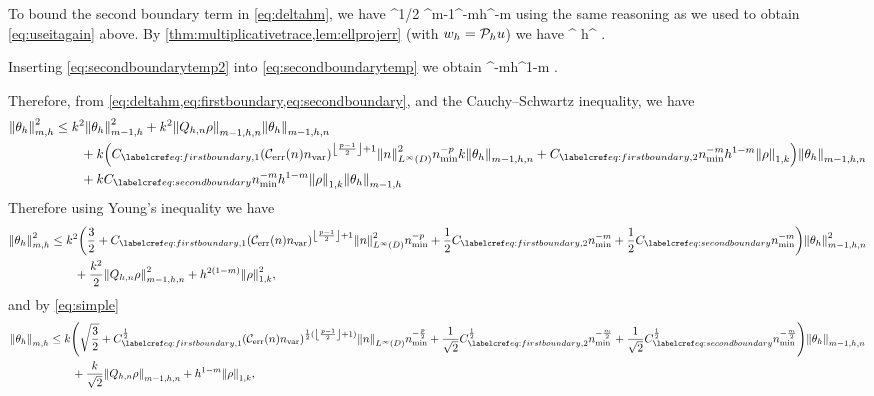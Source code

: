 To bound the second boundary term in \cref{eq:deltahm}, we have
\beq\label{eq:secondboundarytemp}
 \leq \CMT \CinvVhp^{1/2} \Chinv^{m-1}\nmin^{-m}h^{\half-m}\NLtGI{\rho}
\eeq
using the same reasoning as we used to obtain \cref{eq:useitagain} above. By \cref{thm:multiplicativetrace,lem:ellprojerr} (with $w_{h} = \mathcal P_{h} u$) we have
\beq\label{eq:secondboundarytemp2}
\NLtGI{\rho} \leq \CMT {}^{\half} h^{\half} \NW{\rho}.
\eeq

Inserting \cref{eq:secondboundarytemp2} into \cref{eq:secondboundarytemp} we obtain
\beq\label{eq:secondboundary}
 \leq \CBth \nmin^{-m}h^{1-m} \NW{\rho} .
\eeq

Therefore, from\renewcommand{\creflastconjunction}{,~} \cref{eq:deltahm,eq:firstboundary,eq:secondboundary},\renewcommand{\creflastconjunction}{\lastconj} and the Cauchy--Schwartz inequality, we have
\begin{align*}
\Nfn{m,h}{\thetah}^2 &\leq k^2 \Nfn{m-1,h}{\thetah}^2 + k^2 \Nfn{m-1,h,n}{\Qhn \rho}\Nfn{m-1,h,n}{\thetah}\nonumber\\
&\quad\quad+ k\mleft(\CBo \mleft(\En\nvar\mright)^{\floor{\frac{p-1}2}+1}\NLiD{n}^2\nmin^{-p}k \Nfn{m-1,h,n}{\thetah} + \CBt \nmin^{-m}h^{1-m} \NW{\rho}\mright)\Nfn{m-1,h,n}{\thetah}\nonumber\\
&\quad\quad+ k\CBth \nmin^{-m}h^{1-m} \NW{\rho} \Nfn{m-1,h}{\thetah}%
\end{align*}
Therefore using Young's inequality we have
\begin{align*}
\Nfn{m,h}{\thetah}^2 &\leq k^2\mleft(\frac32 + \CBo \mleft(\En\nvar\mright)^{\floor{\frac{p-1}2}+1}\NLiD{n}^2\nmin^{-p} + \half \CBt \nmin^{-m} + \half\CBth \nmin^{-m}\mright)\Nfn{m-1,h,n}{\thetah}^2\\
&\quad\quad+ \frac{k^2}2 \Nfn{m-1,h,n}{\Qhn \rho}^2 +  h^{2(1-m)} \NW{\rho}^2,
\end{align*}
and by \cref{eq:simple}
\begin{align}
\Nfn{m,h}{\thetah} &\leq k\mleft(\sqrt{\frac32} + \CBo^{\half} \mleft(\En\nvar\mright)^{\half(\floor{\frac{p-1}2}+1)}\NLiD{n}\nmin^{-\frac{p}2} + \frac1{\sqrt{2}} \CBt^{\half} \nmin^{-\frac{m}2} + \frac1{\sqrt{2}}\CBth^{\half} \nmin^{-\frac{m}2}\mright)\Nfn{m-1,h,n}{\thetah}\nonumber\\
&\quad\quad+ \frac{k}{\sqrt{2}} \Nfn{m-1,h,n}{\Qhn \rho} +  h^{1-m} \NW{\rho},\label{eq:thetahighnearly}
\end{align}

